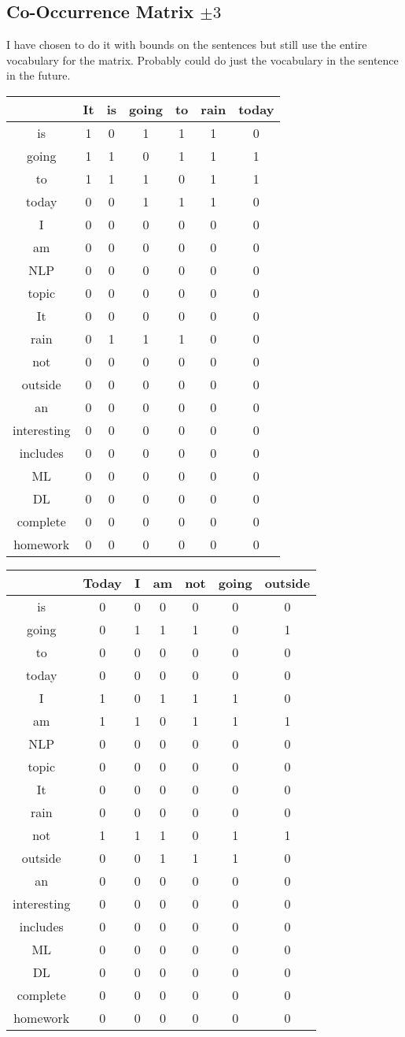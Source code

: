 \subsection{Co-Occurrence Matrix $\pm3$}
I have chosen to do it with bounds on the sentences but still use the entire vocabulary for the matrix. Probably could do just the vocabulary in the sentence in the future. 
\begin{center}
\begin{tabular}{||c ||c c c c c c||}
\hline
	&	It & is & going & to & rain & today \\
\hline
is&1&0&1&1&1&0\\
going&1&1&0&1&1&1\\
to&1&1&1&0&1&1\\
	today&0&0&1&1&1&0\\
I&0&0&0&0&0&0\\
am&0&0&0&0&0&0\\
NLP&0&0&0&0&0&0\\
topic&0&0&0&0&0&0\\
It&0&0&0&0&0&0\\
rain&0&1&1&1&0&0\\
not&0&0&0&0&0&0\\
outside&0&0&0&0&0&0\\
an&0&0&0&0&0&0\\
interesting&0&0&0&0&0&0\\
includes&0&0&0&0&0&0\\
ML&0&0&0&0&0&0\\
DL&0&0&0&0&0&0\\
complete&0&0&0&0&0&0\\
homework&0&0&0&0&0&0\\
\hline
\end{tabular}

\begin{tabular}{||c|| c c c c c c||}
\hline
	&Today& I& am& not& going& outside\\
\hline
	is&0&0&0&0&0&0\\
going&0&1&1&1&0&1\\
to&0&0&0&0&0&0\\
	today&0&0&0&0&0&0\\
I&1&0&1&1&1&0\\
am&1&1&0&1&1&1\\
NLP&0&0&0&0&0&0\\
topic&0&0&0&0&0&0\\
It&0&0&0&0&0&0\\
rain&0&0&0&0&0&0\\
not&1&1&1&0&1&1\\
outside&0&0&1&1&1&0\\
an&0&0&0&0&0&0\\
	interesting&0&0&0&0&0&0\\
includes&0&0&0&0&0&0\\
ML&0&0&0&0&0&0\\
DL&0&0&0&0&0&0\\
complete&0&0&0&0&0&0\\
homework&0&0&0&0&0&0\\
\hline
\end{tabular}


\end{center}
